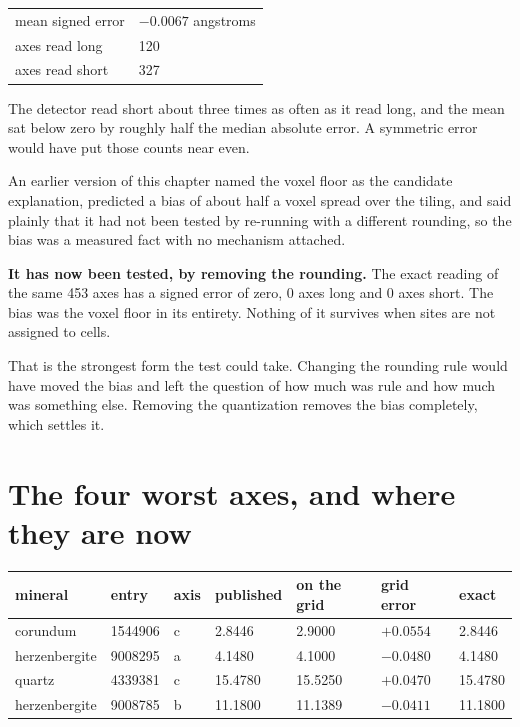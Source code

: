 \begin{longtable}{@{}p{}p{}@{}}
\toprule
\endhead
mean signed error & $-0.0067$ angstroms \\
axes read long & 120 \\
axes read short & 327 \\
\bottomrule
\end{longtable}

The detector read short about three times as often as it read long, and the mean sat below zero by roughly half the median absolute error. A symmetric error would have put those counts near even.

An earlier version of this chapter named the voxel floor as the candidate explanation, predicted a bias of about half a voxel spread over the tiling, and said plainly that it had not been tested by re-running with a different rounding, so the bias was a measured fact with no mechanism attached.

\textbf{It has now been tested, by removing the rounding.} The exact reading of the same 453 axes has a signed error of zero, 0 axes long and 0 axes short. The bias was the voxel floor in its entirety. Nothing of it survives when sites are not assigned to cells.

That is the strongest form the test could take. Changing the rounding rule would have moved the bias and left the question of how much was rule and how much was something else. Removing the quantization removes the bias completely, which settles it.

\section{The four worst axes, and where they are now}

\begin{longtable}{@{}p{}p{}p{}p{}p{}p{}p{}@{}}
\toprule
mineral & entry & axis & published & on the grid & grid error & exact \\
\midrule
\endhead
corundum & 1544906 & c & 2.8446 & 2.9000 & $+0.0554$ & 2.8446 \\
herzenbergite & 9008295 & a & 4.1480 & 4.1000 & $-0.0480$ & 4.1480 \\
quartz & 4339381 & c & 15.4780 & 15.5250 & $+0.0470$ & 15.4780 \\
herzenbergite & 9008785 & b & 11.1800 & 11.1389 & $-0.0411$ & 11.1800 \\
\bottomrule
\end{longtable}


